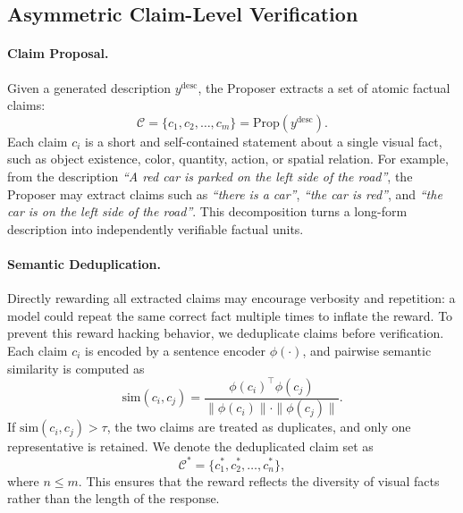 \subsection{Asymmetric Claim-Level Verification}
\label{sec:claim_verification}

\paragraph{Claim Proposal.}
Given a generated description $y^{\mathrm{desc}}$, the Proposer extracts a set
of atomic factual claims:
\begin{equation}
    \mathcal{C}
    =
    \{c_1,c_2,\ldots,c_m\}
    =
    \mathrm{Prop}(y^{\mathrm{desc}}).
\end{equation}
Each claim $c_i$ is a short and self-contained statement about a single visual
fact, such as object existence, color, quantity, action, or spatial relation.
For example, from the description
\textit{``A red car is parked on the left side of the road''}, the Proposer may
extract claims such as \textit{``there is a car''}, \textit{``the car is red''},
and \textit{``the car is on the left side of the road''}. This decomposition
turns a long-form description into independently verifiable factual units.

\paragraph{Semantic Deduplication.}
Directly rewarding all extracted claims may encourage verbosity and repetition:
a model could repeat the same correct fact multiple times to inflate the reward.
To prevent this reward hacking behavior, we deduplicate claims before
verification. Each claim $c_i$ is encoded by a sentence encoder $\phi(\cdot)$,
and pairwise semantic similarity is computed as
\begin{equation}
    \mathrm{sim}(c_i,c_j)
    =
    \frac{
    \phi(c_i)^\top \phi(c_j)
    }{
    \|\phi(c_i)\| \cdot \|\phi(c_j)\|
    }.
\end{equation}
If $\mathrm{sim}(c_i,c_j)>\tau$, the two claims are treated as duplicates, and
only one representative is retained. We denote the deduplicated claim set as
\begin{equation}
    \mathcal{C}^{\ast}
    =
    \{c_1^{\ast},c_2^{\ast},\ldots,c_n^{\ast}\},
\end{equation}
where $n \leq m$. This ensures that the reward reflects the diversity of visual
facts rather than the length of the response.


